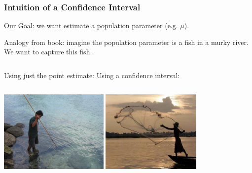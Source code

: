 \documentclass[handout]{beamer}
\newcommand{\blue}[1]{\textcolor{blue2}{#1}}
\begin{document}
\begin{frame}[fragile]
\frametitle{Intuition of a Confidence Interval}

\blue{Our Goal}:  we want estimate a population parameter (e.g. $\mu$).

\blue{Analogy from book}: imagine the population parameter is a fish in a murky river.  We want to capture this fish.

\pause \vspace{0.25cm}

\begin{columns}
  Using just the point estimate:
  Using a \blue{confidence interval}:
\end{columns}

\begin{center}
\includegraphics[height=4cm]{figure/spear.jpg}
\hspace{0.2cm}
\includegraphics[height=4cm]{figure/net.jpg}
\end{center}



\end{frame}
\end{document}
